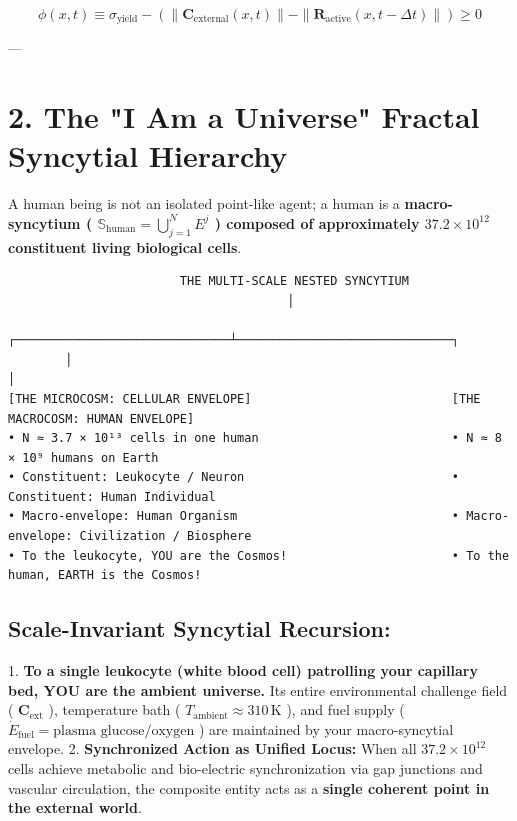 \documentclass[11pt,a4paper]{article}
\theoremstyle{definition}
\theoremstyle{remark}
\begin{document}
\begin{equation}
\phi(x, t) \equiv \sigma_{\text{yield}} - \left( \|\mathbf{C}_{\text{external}}(x, t)\| - \|\mathbf{R}_{\text{active}}(x, t - \Delta t)\| \right) \ge 0
\end{equation}


---

\section{2. The "I Am a Universe" Fractal Syncytial Hierarchy}

A human being is not an isolated point-like agent; a human is a \textbf{macro-syncytium ( $\mathbb{S}_{\text{human}} = \bigcup_{j=1}^N E^j$ ) composed of approximately $37.2 \times 10^{12}$ constituent living biological cells}.

\begin{verbatim}
                        THE MULTI-SCALE NESTED SYNCYTIUM
                                       │
        ┌──────────────────────────────┴──────────────────────────────┐
        │                                                             │
[THE MICROCOSM: CELLULAR ENVELOPE]                            [THE MACROCOSM: HUMAN ENVELOPE]
• N ≈ 3.7 × 10¹³ cells in one human                           • N ≈ 8 × 10⁹ humans on Earth
• Constituent: Leukocyte / Neuron                             • Constituent: Human Individual
• Macro-envelope: Human Organism                              • Macro-envelope: Civilization / Biosphere
• To the leukocyte, YOU are the Cosmos!                       • To the human, EARTH is the Cosmos!
\end{verbatim}

\subsection{Scale-Invariant Syncytial Recursion:}
1. \textbf{To a single leukocyte (white blood cell) patrolling your capillary bed, YOU are the ambient universe.}
Its entire environmental challenge field ( $\mathbf{C}_{\text{ext}}$ ), temperature bath ( $T_{\text{ambient}} \approx 310 \, \mathrm{K}$ ), and fuel supply ( $\dot{E}_{\text{fuel}} = \text{plasma glucose/oxygen}$ ) are maintained by your macro-syncytial envelope.
2. \textbf{Synchronized Action as Unified Locus:}
When all $37.2 \times 10^{12}$ cells achieve metabolic and bio-electric synchronization via gap junctions and vascular circulation, the composite entity acts as a \textbf{single coherent point in the external world}.
\end{document}
